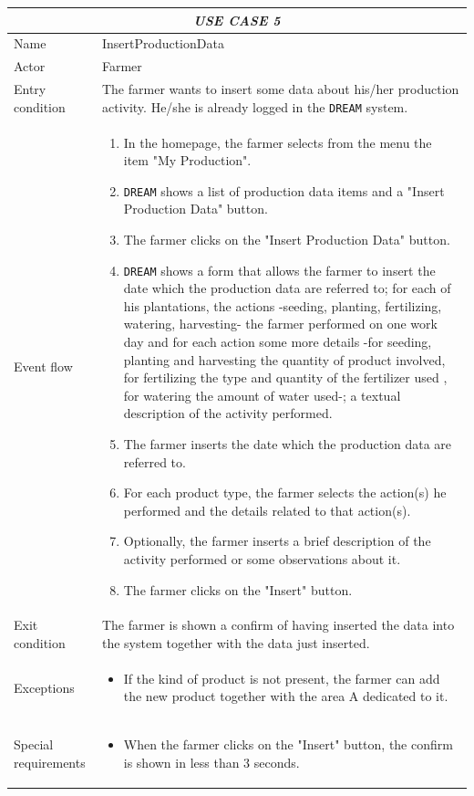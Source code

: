 \documentclass{article}
\begin{document}
\centering
\begin{longtable}{|p{3.5cm}|m{8cm}|}
 \hline
 \multicolumn{2}{|c|}{\cellcolor{white}\emph{USE CASE 5}} \\
 \endfirsthead
 \endhead
 \endfoot
 \endlastfoot
 \hline
 Name & InsertProductionData\\
 \hline
 Actor & Farmer\\
 \hline
 Entry condition & The farmer wants to insert some data about his/her production activity. He/she is already logged in the \verb|DREAM| system.\\
 \hline
 Event flow & \begin{enumerate}
    \item In the homepage, the farmer selects from the menu the item "My Production".
    \item \verb|DREAM| shows a list of production data items and a "Insert Production Data" button.
    \item The farmer clicks on the "Insert Production Data" button.
    \item \verb|DREAM| shows a form that allows the farmer to insert the date which the production data are referred to; for each of his plantations, the actions -seeding, planting, fertilizing, watering, harvesting- the farmer performed on one work day and for each action some more details -for seeding, planting and harvesting the quantity of product involved, for fertilizing the type and quantity of the fertilizer used , for watering the amount of water used-; a textual description of the activity performed.
    \item The farmer inserts the date which the production data are referred to.
    \item For each product type, the farmer selects the action(s) he performed and the details related to that action(s).
    \item Optionally, the farmer inserts a brief description of the activity performed or some observations about it.
    \item The farmer clicks on the "Insert" button.
    \color{black}
 \end{enumerate}\\
 \hline
 Exit condition & The farmer is shown a confirm of having inserted the data into the system together with the data just inserted.\\
 \hline
 Exceptions & \begin{itemize}
     \item If the kind of product is not present, the farmer can add the new product together with the area A dedicated to it.
 \end{itemize}\\
 \hline
 Special requirements & \begin{itemize}
     \item When the farmer clicks on the "Insert" button, the confirm is shown in less than 3 seconds.
 \end{itemize}\\
 \hline
\end{longtable}
\end{document}

